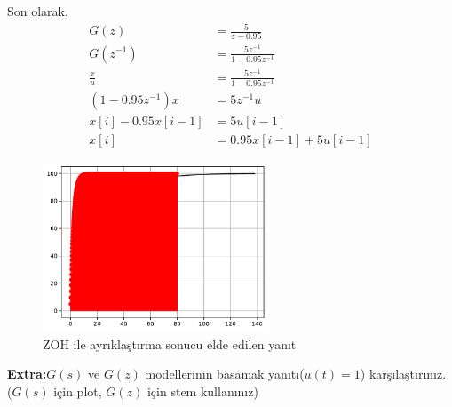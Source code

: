 Son olarak,
\begin{equation}
    \begin{split}
        G(z)&=\frac{5}{z-0.95}\\
        G(z^{-1})&=\frac{5z^{-1}}{1-0.95z^{-1}}\\
        \frac{x}{u}&=\frac{5z^{-1}}{1-0.95z^{-1}}\\
        (1-0.95z^{-1})x&=5z^{-1}u\\
        x[i]-0.95x[i-1]&=5u[i-1]\\
        x[i]&=0.95x[i-1]+5u[i-1]
    \end{split}
\end{equation}

\begin{figure}[!htb]
    \centering
    \includegraphics[width=0.6\textwidth]{q1.pdf}
    \caption{ZOH ile ayrıklaştırma sonucu elde edilen yanıt}\label{fig:q1}
\end{figure}

\noindent\textbf{Extra:}$G(s)$ ve $G(z)$ modellerinin basamak yanıtı($u(t)=1$) karşılaştırınız. ($G(s)$ için plot, $G(z)$ için stem kullanınız)

